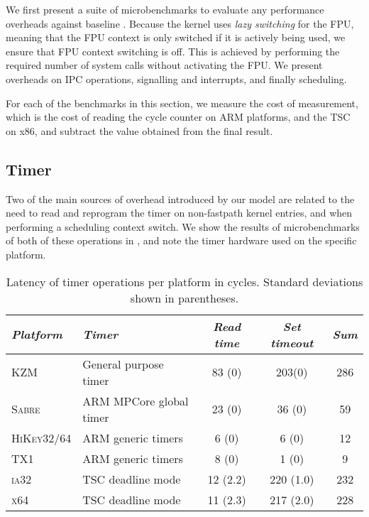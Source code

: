 We first present a suite of microbenchmarks to evaluate any performance overheads against baseline
\selfour.
Because the kernel uses \emph{lazy switching} for the \gls{FPU}, meaning that the \gls{FPU} context is only
switched if it is actively being used, we ensure that \gls{FPU} context switching
is off. This is achieved by performing the required number of system calls 
without activating the \gls{FPU}. We present
overheads on IPC operations, signalling and interrupts, and finally scheduling. 

For each of the benchmarks in this section, we measure the cost of measurement, which is the cost of reading the
cycle counter on ARM platforms, and the \gls{TSC} on x86, and subtract the value obtained
from the final result.

\subsection{Timer}
\label{s:eval-timer}

Two of the main sources of overhead introduced by our model are related to the need to read and
reprogram the timer on non-fastpath kernel entries, and when performing a scheduling context switch.
We show the results of microbenchmarks of both of these operations in , and
note the timer hardware used on the specific platform. 

\begin{table}[t]\centering
{}
\begin{tabularx}{\textwidth}{lXccc}\toprule
    \emph{Platform} & \emph{Timer} & \emph{Read time} & \emph{Set timeout} & \emph{Sum}
    \\\midrule
    \textsc{KZM}               & General purpose timer    & 83 (0)   & 203(0)  & 286   \\
    \textsc{Sabre}             & ARM MPCore global timer  & 23 (0)   & 36 (0)  & 59    \\
    \textsc{HiKey32/64}        & ARM generic timers       &  6 (0)   &  6 (0)  & 12    \\
    \textsc{TX1}               & ARM generic timers       &  8 (0)   &  1 (0)  & 9     \\
    \textsc{ia32}              & TSC deadline mode        & 12 (2.2) & 220 (1.0) & 232 \\
    \textsc{x64}               & TSC deadline mode        & 11 (2.3) & 217 (2.0) & 228 \\
    \bottomrule\hline
\end{tabularx}
\caption[Latency of timer operations.]{Latency of timer operations per platform in cycles. Standard deviations shown
in parentheses.}
\label{t:evaluation-timer}
\end{table}

